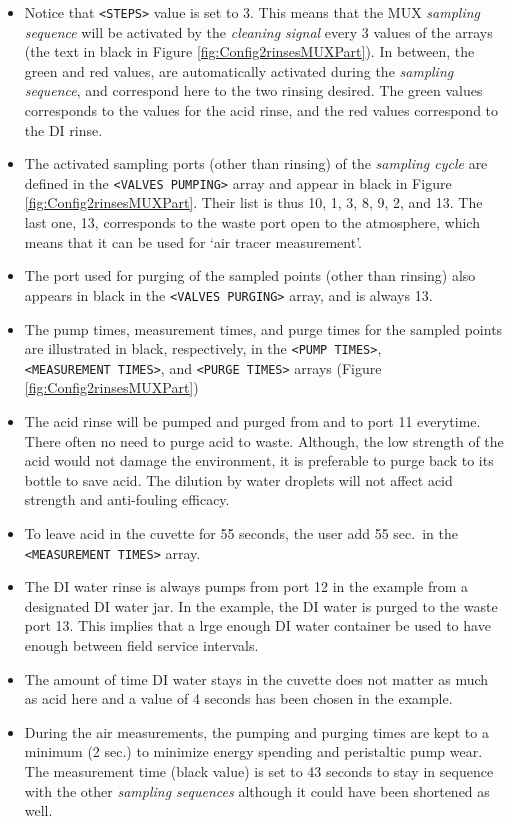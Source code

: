 \documentclass[]{book}
\providecommand{\tightlist}{%
  \setlength{\itemsep}{0pt}\setlength{\parskip}{0pt}}
\begin{document}
\begin{itemize}
\tightlist
\item
  Notice that \texttt{\textless{}STEPS\textgreater{}} value is set to 3. This means that the MUX \emph{sampling sequence} will be activated by the \emph{cleaning signal} every 3 values of the arrays (the text in black in Figure \ref{fig:Config2rinsesMUXPart}). In between, the green and red values, are automatically activated during the \emph{sampling sequence}, and correspond here to the two rinsing desired. The green values corresponds to the values for the acid rinse, and the red values correspond to the DI rinse.
\item
  The activated sampling ports (other than rinsing) of the \emph{sampling cycle} are defined in the \texttt{\textless{}VALVES\ PUMPING\textgreater{}} array and appear in black in Figure \ref{fig:Config2rinsesMUXPart}. Their list is thus 10, 1, 3, 8, 9, 2, and 13. The last one, 13, corresponds to the waste port open to the atmosphere, which means that it can be used for `air tracer measurement'.
\item
  The port used for purging of the sampled points (other than rinsing) also appears in black in the \texttt{\textless{}VALVES\ PURGING\textgreater{}}
  array, and is always 13.
\item
  The pump times, measurement times, and purge times for the sampled points are illustrated in black, respectively, in the \texttt{\textless{}PUMP\ TIMES\textgreater{}}, \texttt{\textless{}MEASUREMENT\ TIMES\textgreater{}}, and \texttt{\textless{}PURGE\ TIMES\textgreater{}} arrays (Figure \ref{fig:Config2rinsesMUXPart})
\item
  The acid rinse will be pumped and purged from and to port 11 everytime. There often no need to purge acid to waste. Although, the low strength of the acid would not damage the environment, it is preferable to purge back to its bottle to save acid. The dilution by water droplets will not affect acid strength and anti-fouling efficacy.
\item
  To leave acid in the cuvette for 55 seconds, the user add 55 sec.~in the \texttt{\textless{}MEASUREMENT\ TIMES\textgreater{}} array.
\item
  The DI water rinse is always pumps from port 12 in the example from a designated DI water jar. In the example, the DI water is purged to the waste port 13. This implies that a lrge enough DI water container be used to have enough between field service intervals.
\item
  The amount of time DI water stays in the cuvette does not matter as much as acid here and a value of 4 seconds has been chosen in the example.
\item
  During the air measurements, the pumping and purging times are kept to a minimum (2 sec.) to minimize energy spending and peristaltic pump wear. The measurement time (black value) is set to 43 seconds to stay in sequence with the other \emph{sampling sequences} although it could have been shortened as well.
\end{itemize}
\end{document}
